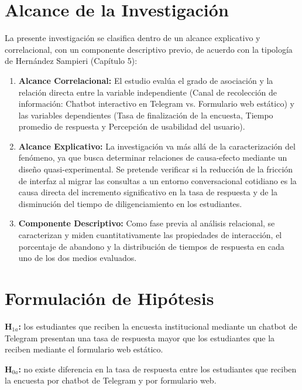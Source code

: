 \documentclass[12pt,letterpaper]{article}
\begin{document}
\section{Alcance de la Investigación}

La presente investigación se clasifica dentro de un alcance explicativo y correlacional, con un componente descriptivo previo, de acuerdo con la tipología de Hernández Sampieri (Capítulo 5):

\begin{enumerate}
\item \textbf{Alcance Correlacional:} El estudio evalúa el grado de asociación y la relación directa entre la variable independiente (Canal de recolección de información: Chatbot interactivo en Telegram vs. Formulario web estático) y las variables dependientes (Tasa de finalización de la encuesta, Tiempo promedio de respuesta y Percepción de usabilidad del usuario).


\item \textbf{Alcance Explicativo:} La investigación va más allá de la caracterización del fenómeno, ya que busca determinar relaciones de causa-efecto mediante un diseño quasi-experimental. Se pretende verificar si la reducción de la fricción de interfaz al migrar las consultas a un entorno conversacional cotidiano es la causa directa del incremento significativo en la tasa de respuesta y de la disminución del tiempo de diligenciamiento en los estudiantes.

\item \textbf{Componente Descriptivo:} Como fase previa al análisis relacional, se caracterizan y miden cuantitativamente las propiedades de interacción, el porcentaje de abandono y la distribución de tiempos de respuesta en cada uno de los dos medios evaluados.


\end{enumerate}


\section{Formulación de Hipótesis}
\textbf{H$_{1a}$:} los estudiantes que reciben la encuesta institucional mediante un chatbot de Telegram presentan una tasa de respuesta mayor que los estudiantes que la reciben mediante el formulario web estático.

\textbf{H$_{0a}$:} no existe diferencia en la tasa de respuesta entre los estudiantes que reciben la encuesta por chatbot de Telegram y por formulario web.
\end{document}
